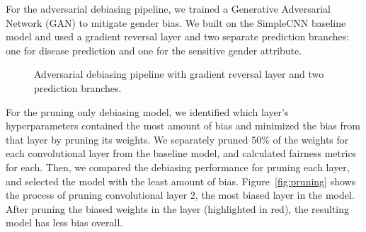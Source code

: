 \documentclass[11pt]{article}
\begin{document}
For the adversarial debiasing pipeline, we trained a Generative Adversarial Network (GAN) to mitigate gender bias. We built on the SimpleCNN baseline model and used a gradient reversal layer and two separate prediction branches: one for disease prediction and one for the sensitive gender attribute.

\begin{figure}[H]
\centering
{}
\caption{Adversarial debiasing pipeline with gradient reversal layer and two prediction branches.}
\label{fig:adversarial}
\end{figure}

For the pruning only debiasing model, we identified which layer's hyperparameters contained the most amount of bias and minimized the bias from that layer by pruning its weights. We separately pruned 50\% of the weights for each convolutional layer from the baseline model, and calculated fairness metrics for each. Then, we compared the debiasing performance for pruning each layer, and selected the model with the least amount of bias. Figure~\ref{fig:pruning} shows the process of pruning convolutional layer 2, the most biased layer in the model. After pruning the biased weights in the layer (highlighted in red), the resulting model has less bias overall.
\end{document}
